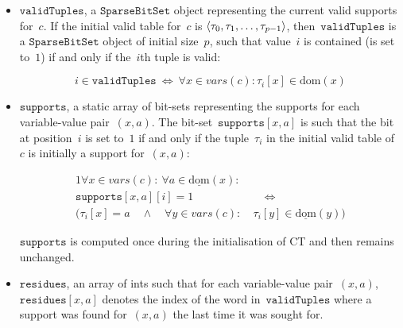\documentclass[a4paper,11pt]{article}
\newcommand{\Dom}[1]{\text{dom}({#1})}
\newcommand{\Dominit}[1]{\underline{\text{dom}}(#1)}
\newcommand{\SparseBitSet}{\texttt{SparseBitSet}}
\newcommand{\Scp}{\texttt{vars}}
\newcommand{\CurrTable}{\texttt{validTuples}}
\newcommand{\Supports}{\texttt{supports}}
\newcommand{\Residues}{\texttt{residues}}
\numberwithin{equation}{section}
\begin{document}
\begin{itemize}
  
  \item $\CurrTable$, a $\SparseBitSet$ object representing the current valid
    supports for~$c$. If the initial valid table for~$c$
    is $\left\langle\tau_0, \tau_1, \ldots, \tau_{p-1}\right\rangle$,
    then~$\CurrTable$ is a 
    $\SparseBitSet$ object of initial size~$p$, such that value~$i$
    is contained (is set to~$1$) if and only if the~$i$th tuple is valid:
    
    \begin{equation} \label{eq:currtable}
      i \in \CurrTable \ \Leftrightarrow \ \forall x \in vars(c): \tau_i[x] \in \Dom{x}
    \end{equation}

  \item $\Supports$, a static array of bit-sets representing
    the supports for each variable-value pair~$(x,a)$.
    The bit-set~$\Supports[x,a]$ is such that
    the bit at position~$i$ is set to~$1$ if and only if the 
    tuple~$\tau_i$ in the initial valid table of~$c$ is initially a support for~$(x,a)$:

    \begin{alignat}{1}
      \forall x \in vars(c): \ \forall a \in \Dominit{x}:& \\
      \Supports[x,a][i] = 1 &\quad \Leftrightarrow \\
      (\tau_i[x] = a \quad \land \quad
      \forall y \in vars(c): \ &\tau_i[y] \in \Dominit{y})
    \end{alignat}

    $\Supports$ is computed once during the initialisation of CT and then
    remains unchanged.
    
  \item $\Residues$, an array of ints such that for each variable-value pair~$(x,a)$,
    $\Residues[x,a]$ denotes the index of the word in~$\CurrTable$ where a support
    was found for~$(x,a)$ the last time it was sought for.

\end{itemize}
\end{document}
